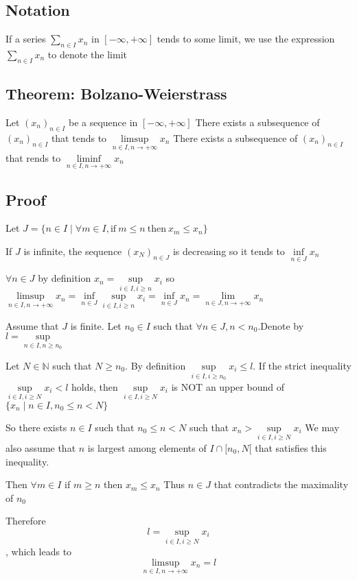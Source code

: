 \documentclass{book}
\begin{document}
\subsection{Notation}
If a series $\sum\limits_{n\in I}x_n$ in $[-\infty,+\infty]$ tends to some limit, we use the expression $\sum\limits_{n\in I}x_n$ to denote the limit
\subsection{Theorem: Bolzano-Weierstrass}
Let $(x_n)_{n\in I}$ be a sequence in $[-\infty,+\infty]$ There exists a subsequence of $(x_n)_{n\in I}$ that tends to $\limsup\limits_{n\in I,n\rightarrow +\infty}x_n$ There exists a subsequence of $(x_n)_{n\in I}$ that rends to $\liminf\limits_{n\in I,n\rightarrow +\infty}x_n$
\subsection*{Proof}
Let $J=\{n\in I \mid \forall m\in I,\text{if}\ m\leq n\ \text{then}\ x_m\leq x_n\}$

\indent If $J$ is infinite, the sequence $(x_N)_{n\in J}$ is decreasing so it tends to $\inf\limits_{n\in J}x_n$

\indent $\forall n\in J$ by definition $x_n=\sup\limits_{i\in I,i\geq n}x_i$ so $\limsup\limits_{n\in I,n\rightarrow+\infty}x_n=\inf\limits_{n\in J}\sup\limits_{i\in I,i\geq n}x_i=\inf\limits_{n\in J}x_n=\lim\limits_{n\in J,n\rightarrow+\infty}x_n$

\indent Assume that $J$ is finite. Let $n_0\in I$ such that $\forall n\in J,n<n_0$.Denote by $l=\sup\limits_{n\in I,n\geq n_0}$

\indent Let $N\in\mathbb{N}$ such that $N\geq n_0$. By definition $\sup\limits_{i\in  I,i\geq n_0}x_i\leq l$. If the strict inequality $\sup\limits_{i\in I,i\geq N}x_i<l$ holds, then $\sup\limits_{i\in I,i\geq N}x_i$ is NOT an upper bound of $\{x_n\mid n\in I,n_0\leq n<N\}$

\indent So there exists $n\in I$ such that $n_0\leq n<N$ such that $x_n>\sup\limits_{i\in I,i\geq N}x_i$ We may also assume that $n $ is largest among elements of {$I\cap[n_0,N[$} that satisfies this inequality.

Then $\forall m\in I$ if $m\geq n$ then $x_m\leq x_n$ Thus $n\in J$ that contradicts the maximality of $n_0$

Therefore $$l=\sup\limits_{i\in I,i\geq N}x_i$$, which leads to $$\limsup\limits_{n\in I,n\rightarrow+\infty}x_n=l$$
\end{document}
